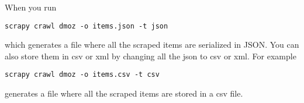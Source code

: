 When you run
\begin{lstlisting}
scrapy crawl dmoz -o items.json -t json
\end{lstlisting}
which generates a file  where all the scraped items are serialized in JSON. You can also store them in csv or xml by changing all the json to csv or xml.
For example
\begin{lstlisting}
scrapy crawl dmoz -o items.csv -t csv
\end{lstlisting}
generates a file  where all the scraped items are stored in a csv file.

\begin{comment}
To begin a project go to the directory where you want to store the code and run
\begin{lstlisting}
scrapy startproject <project name>
\end{lstlisting}
This will create several files. \li{scrapy.cfg} is a configuration file. It will create folder called \li{<project name>} , that contains files \li{items.py}, \li{pipelines.py}, \li{settings.py} and a directory called \li{spiders}. We will use all this files.

\section*{Items}
Items are like python dictionaries with some addtional functionality. Go to the items.py found in the  \li{<project name>} directory. items are labels for the data that you be storing.

\begin{lstlisting}
from scrapy.item import Item, Field

class <project name>Item(Item):
    <item1> = Field()
    <item2> = Field()
    <item3> = Field()
\end{lstlisting}

\section*{Spiders}
Spiders are classes used to scrape data from a group of websites. You will define calsses that define the initail list of URLs to download, how to follow the links, and how to parse the contents of the pages into your items objects. There are two main spiders. \li{BaseSpider} and \li{CrawlSpider}. A BaseSpider is used for one website and a CrawlSpider used for crawling mulitple websites.

We will start with a BaseSpider. Go in your spider directory and create a new file (the name of the file does not matter). Subcalss BaseSpider as shown below. A BaseSpider has three things. A name that is a unique identifier, \li{start_urls} which is a list of URLS from which the spider will begin to crawl from and parse(), a method which will be called with the Response object at the beginning of each url.


\end{comment}
